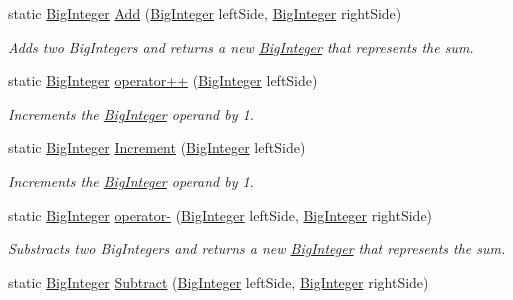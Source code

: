 \begin{DoxyCompactItemize}
static \hyperlink{class_scott_garland_1_1_big_integer}{Big\+Integer} \hyperlink{class_scott_garland_1_1_big_integer_ac2c1dce674b509a0602a4bd8e3fa0e7f}{Add} (\hyperlink{class_scott_garland_1_1_big_integer}{Big\+Integer} left\+Side, \hyperlink{class_scott_garland_1_1_big_integer}{Big\+Integer} right\+Side)
\begin{DoxyCompactList}\small\item\em Adds two Big\+Integers and returns a new \hyperlink{class_scott_garland_1_1_big_integer}{Big\+Integer} that represents the sum. \end{DoxyCompactList}\item 
static \hyperlink{class_scott_garland_1_1_big_integer}{Big\+Integer} \hyperlink{class_scott_garland_1_1_big_integer_a587f039d590d2dd6e8135fc1b74c82c1}{operator++} (\hyperlink{class_scott_garland_1_1_big_integer}{Big\+Integer} left\+Side)
\begin{DoxyCompactList}\small\item\em Increments the \hyperlink{class_scott_garland_1_1_big_integer}{Big\+Integer} operand by 1. \end{DoxyCompactList}\item 
static \hyperlink{class_scott_garland_1_1_big_integer}{Big\+Integer} \hyperlink{class_scott_garland_1_1_big_integer_a21e007e5a3c6fdd5c1fbd7daa41e9f8c}{Increment} (\hyperlink{class_scott_garland_1_1_big_integer}{Big\+Integer} left\+Side)
\begin{DoxyCompactList}\small\item\em Increments the \hyperlink{class_scott_garland_1_1_big_integer}{Big\+Integer} operand by 1. \end{DoxyCompactList}\item 
static \hyperlink{class_scott_garland_1_1_big_integer}{Big\+Integer} \hyperlink{class_scott_garland_1_1_big_integer_a7ce71794183add63e9e97151290b65b3}{operator-\/} (\hyperlink{class_scott_garland_1_1_big_integer}{Big\+Integer} left\+Side, \hyperlink{class_scott_garland_1_1_big_integer}{Big\+Integer} right\+Side)
\begin{DoxyCompactList}\small\item\em Substracts two Big\+Integers and returns a new \hyperlink{class_scott_garland_1_1_big_integer}{Big\+Integer} that represents the sum. \end{DoxyCompactList}\item 
static \hyperlink{class_scott_garland_1_1_big_integer}{Big\+Integer} \hyperlink{class_scott_garland_1_1_big_integer_a7e0f9a9d2a70f35407d808b143ac7a0a}{Subtract} (\hyperlink{class_scott_garland_1_1_big_integer}{Big\+Integer} left\+Side, \hyperlink{class_scott_garland_1_1_big_integer}{Big\+Integer} right\+Side)

\end{DoxyCompactItemize}

